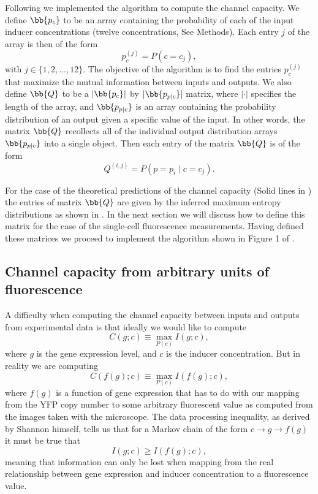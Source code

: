 Following \cite{Blahut1972} we implemented the algorithm to compute the channel
capacity. We define $\bb{p_c}$ to be an array containing the probability of
each of the input inducer concentrations (twelve concentrations, See Methods).
Each entry $j$ of the array is then of the form
\begin{equation}
  p_c^{(j)} = P(c = c_j),
\end{equation}
with $j \in \{1, 2, \ldots, 12 \}$. The objective of the algorithm is to find
the entries $p_c^{(j)}$ that maximize the mutual information between inputs and
outputs. We also define $\bb{Q}$ to be a $\vert \bb{p_c} \vert$ by
$\vert \bb{p_{p \mid c}} \vert$ matrix, where $\vert \cdot \vert$ specifies the
length of the array, and $\bb{p_{p \mid c}}$ is an array containing the
probability distribution of an output given a specific value of the input. In
other words, the matrix $\bb{Q}$ recollects all of the individual output
distribution arrays $\bb{p_{p \mid c}}$ into a single object. Then each entry
of the matrix $\bb{Q}$ is of the form
\begin{equation}
  Q^{(i, j)} = P(p = p_i \mid c = c_j).
\end{equation}

For the case of the theoretical predictions of the channel capacity (Solid
lines in ) the entries of matrix $\bb{Q}$ are given by the
inferred maximum entropy distributions as shown in . In the
next section we will discuss how to define this matrix for the case of the
single-cell fluorescence measurements. Having defined these matrices we proceed
to implement the algorithm shown in Figure 1 of \cite{Blahut1972}.

\subsection{Channel capacity from arbitrary units of fluorescence}

A difficulty when computing the channel capacity between inputs and outputs
from experimental data is that ideally we would like to compute
\begin{equation}
C(g; c) \equiv \max_{P(c)} I(g; c),
\end{equation}
where $g$ is the gene expression level, and $c$ is the inducer concentration.
But in reality we are computing
\begin{equation}
C(f(g); c) \equiv \max_{P(c)} I(f(g); c),
\end{equation}
where $f(g)$ is a function of gene expression that has to do with our mapping
from the YFP copy number to some arbitrary fluorescent value as computed from
the images taken with the microscope. The data processing inequality, as
derived by Shannon himself, tells us that for a Markov chain of the form $c
\rightarrow
g \rightarrow f(g)$ it must be true that \cite{Shannon1948}
\begin{equation}
I(g; c) \geq I(f(g); c),
\end{equation}
meaning that information can only be lost when mapping from the real
relationship between gene expression and inducer concentration to a
fluorescence value.

